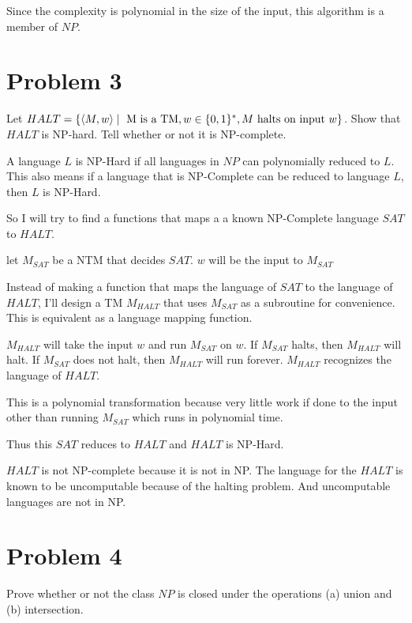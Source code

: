 \documentclass[12pt]{article}
\begin{document}
Since the complexity is polynomial in the size of the input, this algorithm is a member of $NP$.


\section*{Problem 3}
\begin{questionbox}
	Let $HALT = \{ \braket{M, w} \mid \text{ M is a TM}, w \in \{0,1\}^*, M \text { halts on input } w  \}$. Show that $HALT$ is NP-hard. Tell whether or not it is NP-complete.
\end{questionbox}

A language $L$ is NP-Hard if all languages in $NP$ can polynomially reduced to $L$.
This also means if a language that is NP-Complete can be reduced to language $L$, then $L$ is NP-Hard.

So I will try to find a functions that maps a a known NP-Complete language $SAT$ to $HALT$.

let $M_{SAT}$ be a NTM that decides $SAT$. $w$ will be the input to $M_{SAT}$

Instead of making a function that maps the language of $SAT$ to the language of $HALT$, I'll design a TM $M_{HALT}$ that uses $M_{SAT}$ as a subroutine for convenience. This is equivalent as a language mapping function.

$M_{HALT}$ will take the input $w$ and run $M_{SAT}$ on $w$. If $M_{SAT}$ halts, then $M_{HALT}$ will halt. If $M_{SAT}$ does not halt, then $M_{HALT}$ will run forever. $M_{HALT}$ recognizes the language of $HALT$.

This is a polynomial transformation because very little work if done to the input other than running $M_{SAT}$ which runs in polynomial time.

Thus this $SAT$ reduces to $HALT$ and $HALT$ is NP-Hard.

$HALT$ is not NP-complete because it is not in NP. The language for the $HALT$ is known to be uncomputable because of the halting problem. And uncomputable languages are not in NP.


\section*{Problem 4}

\begin{questionbox}
		Prove whether or not the class $NP$ is closed under the operations (a) union and (b) intersection.
\end{questionbox}
\end{document}
